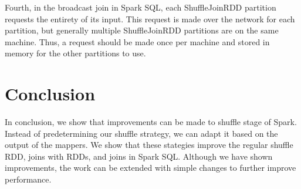 Fourth, in the broadcast join in Spark SQL, each ShuffleJoinRDD partition requests the entirety of its input.
This request is made over the network for each partition, but generally multiple ShuffleJoinRDD partitions are on the same machine.
Thus, a request should be made once per machine and stored in memory for the other partitions to use. 

\section {Conclusion}
In conclusion, we show that improvements can be made to shuffle stage of Spark.
Instead of predetermining our shuffle strategy, we can adapt it based on the output of the mappers.
We show that these stategies improve the regular shuffle RDD, joins with RDDs, and  
joins in Spark SQL. Although we have shown improvements, the work can be extended with simple changes
to further improve performance. 



